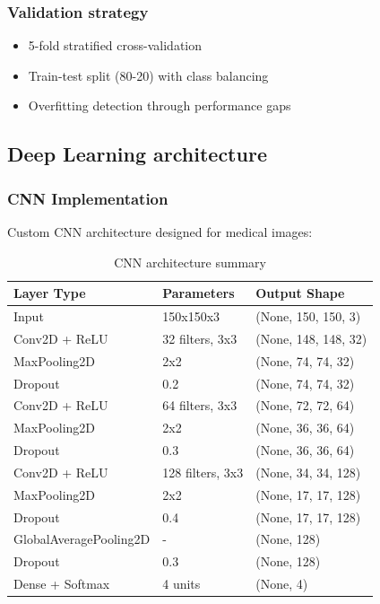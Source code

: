 \documentclass[11pt]{article}
\begin{document}
\subsubsection{Validation strategy}
\begin{itemize}
    \item 5-fold stratified cross-validation
    \item Train-test split (80-20) with class balancing
    \item Overfitting detection through performance gaps
\end{itemize}

\subsection{Deep Learning architecture}

\subsubsection{CNN Implementation}
Custom CNN architecture designed for medical images:

\begin{table}[H]
\centering
\caption{CNN architecture summary}
\begin{tabular}{lll}
\toprule
\textbf{Layer Type} & \textbf{Parameters} & \textbf{Output Shape} \\
\midrule
Input & 150x150x3 & (None, 150, 150, 3) \\
Conv2D + ReLU & 32 filters, 3x3 & (None, 148, 148, 32) \\
MaxPooling2D & 2x2 & (None, 74, 74, 32) \\
Dropout & 0.2 & (None, 74, 74, 32) \\
Conv2D + ReLU & 64 filters, 3x3 & (None, 72, 72, 64) \\
MaxPooling2D & 2x2 & (None, 36, 36, 64) \\
Dropout & 0.3 & (None, 36, 36, 64) \\
Conv2D + ReLU & 128 filters, 3x3 & (None, 34, 34, 128) \\
MaxPooling2D & 2x2 & (None, 17, 17, 128) \\
Dropout & 0.4 & (None, 17, 17, 128) \\
GlobalAveragePooling2D & - & (None, 128) \\
Dropout & 0.3 & (None, 128) \\
Dense + Softmax & 4 units & (None, 4) \\
\bottomrule
\end{tabular}
\end{table}
\end{document}
